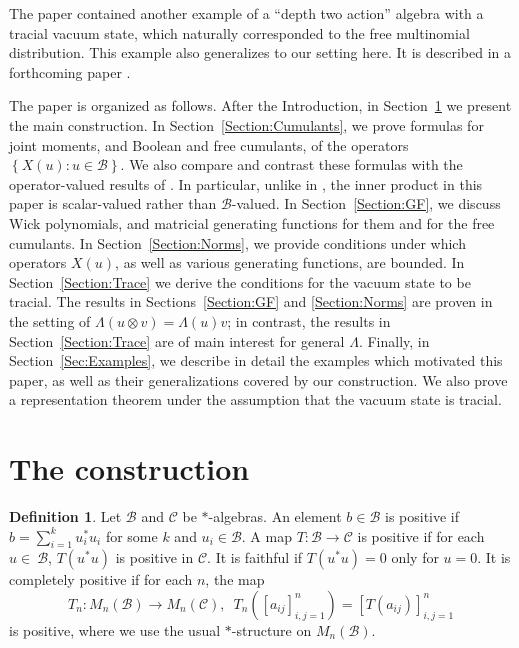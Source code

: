 \documentclass[12pt]{amsart}
\theoremstyle{definition}
\newtheorem{Defn}[Thm]{Definition}
\newcommand{\set}[1]{\left\{#1\right\}}
\newcommand{\mc}[1]{\mathcal{#1}}
\begin{document}
The paper \cite{AnsFree-Meixner} contained another example of a ``depth two action'' algebra with a tracial vacuum state, which naturally corresponded to the free multinomial distribution. This example also generalizes to our setting here. It is described in a forthcoming paper \cite{Ans-Mashburn-Centered}.


The paper is organized as follows. After the Introduction, in Section~\ref{Section:Construction} we present the main construction. In Section~\ref{Section:Cumulants}, we prove formulas for joint moments, and Boolean and free cumulants, of the operators $\set{X(u) : u \in \mc{B}}$. We also compare and contrast these formulas with the operator-valued results of \cite{Ans-Williams-Jacobi}. In particular, unlike in \cite{Ans-Williams-Jacobi}, the inner product in this paper is scalar-valued rather than $\mc{B}$-valued. In Section~\ref{Section:GF}, we discuss Wick polynomials, and matricial generating functions for them and for the free cumulants. In Section~\ref{Section:Norms}, we provide conditions under which operators $X(u)$, as well as various generating functions, are bounded. In Section~\ref{Section:Trace} we derive the conditions for the vacuum state to be tracial. The results in Sections~\ref{Section:GF} and \ref{Section:Norms} are proven in the setting of $\Lambda(u \otimes v) = \Lambda(u) v$; in contrast, the results in Section~\ref{Section:Trace} are of main interest for general $\Lambda$. Finally, in Section~\ref{Sec:Examples}, we describe in detail the examples which motivated this paper, as well as their generalizations covered by our construction. We also prove a representation theorem under the assumption that the vacuum state is tracial.



\section{The construction}
\label{Section:Construction}

\begin{Defn}
Let $\mc{B}$ and $\mc{C}$ be $\ast$-algebras. An element $b \in \mc{B}$ is positive if $b = \sum_{i=1}^k u_i^\ast u_i$ for some $k$ and $u_i \in \mc{B}$. A map $T: \mc{B} \rightarrow \mc{C}$ is positive if for each $u \in \ \mc{B}$, $T(u^\ast u)$ is positive in $\mc{C}$. It is faithful if $T(u^\ast u) = 0$ only for $u = 0$. It is completely positive if for each $n$, the map
\begin{equation*}
T_n : M_n(\mc{B}) \rightarrow M_n(\mc{C}), \,\,\, T_n\left( [a_{ij}]_{i,j=1}^n \right) = [T(a_{ij})]_{i,j=1}^n
\end{equation*}
is positive, where we use the usual $\ast$-structure on $M_n(\mc{B})$.
\end{Defn}
\end{document}

